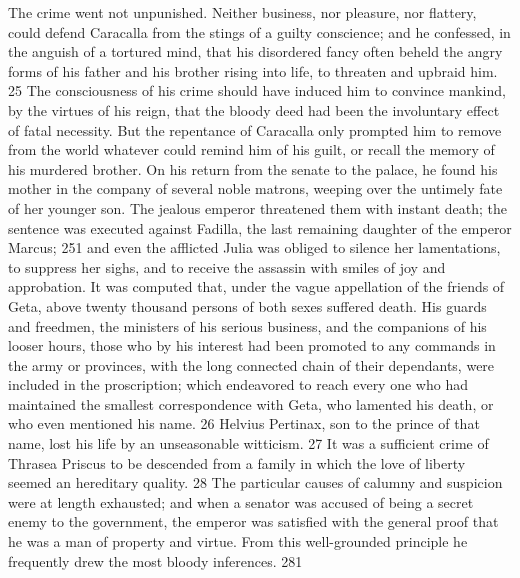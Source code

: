 The crime went not unpunished. Neither business, nor pleasure,
nor flattery, could defend Caracalla from the stings of a guilty
conscience; and he confessed, in the anguish of a tortured mind,
that his disordered fancy often beheld the angry forms of his
father and his brother rising into life, to threaten and upbraid
him. 25 The consciousness of his crime should have induced him to
convince mankind, by the virtues of his reign, that the bloody
deed had been the involuntary effect of fatal necessity. But the
repentance of Caracalla only prompted him to remove from the
world whatever could remind him of his guilt, or recall the
memory of his murdered brother. On his return from the senate to
the palace, he found his mother in the company of several noble
matrons, weeping over the untimely fate of her younger son. The
jealous emperor threatened them with instant death; the sentence
was executed against Fadilla, the last remaining daughter of the
emperor Marcus; 251 and even the afflicted Julia was obliged to
silence her lamentations, to suppress her sighs, and to receive
the assassin with smiles of joy and approbation. It was computed
that, under the vague appellation of the friends of Geta, above
twenty thousand persons of both sexes suffered death. His guards
and freedmen, the ministers of his serious business, and the
companions of his looser hours, those who by his interest had
been promoted to any commands in the army or provinces, with the
long connected chain of their dependants, were included in the
proscription; which endeavored to reach every one who had
maintained the smallest correspondence with Geta, who lamented
his death, or who even mentioned his name. 26 Helvius Pertinax,
son to the prince of that name, lost his life by an unseasonable
witticism. 27 It was a sufficient crime of Thrasea Priscus to be
descended from a family in which the love of liberty seemed an
hereditary quality. 28 The particular causes of calumny and
suspicion were at length exhausted; and when a senator was
accused of being a secret enemy to the government, the emperor
was satisfied with the general proof that he was a man of
property and virtue. From this well-grounded principle he
frequently drew the most bloody inferences. 281



